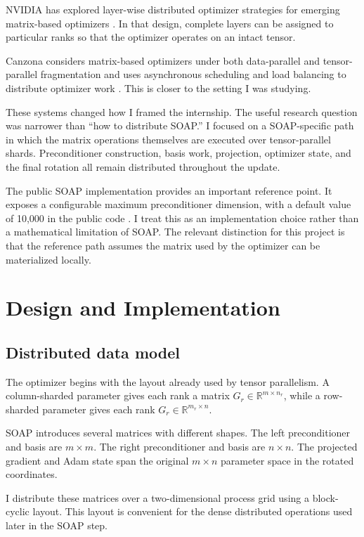 \documentclass[11pt]{article}
\begin{document}
NVIDIA has explored layer-wise distributed optimizer strategies for emerging matrix-based optimizers \citep{nvidia2026layerwise,nvidia2026emerging}. In that design, complete layers can be assigned to particular ranks so that the optimizer operates on an intact tensor.

Canzona considers matrix-based optimizers under both data-parallel and tensor-parallel fragmentation and uses asynchronous scheduling and load balancing to distribute optimizer work \citep{wang2026canzona}. This is closer to the setting I was studying.

These systems changed how I framed the internship. The useful research question was narrower than ``how to distribute SOAP.'' I focused on a SOAP-specific path in which the matrix operations themselves are executed over tensor-parallel shards. Preconditioner construction, basis work, projection, optimizer state, and the final rotation all remain distributed throughout the update.

The public SOAP implementation provides an important reference point. It exposes a configurable maximum preconditioner dimension, with a default value of 10,000 in the public code \citep{soapgithub}. I treat this as an implementation choice rather than a mathematical limitation of SOAP. The relevant distinction for this project is that the reference path assumes the matrix used by the optimizer can be materialized locally.

\section{Design and Implementation}

\subsection{Distributed data model}

The optimizer begins with the layout already used by tensor parallelism. A column-sharded parameter gives each rank a matrix
$G_r \in \mathbb{R}^{m \times n_r}$, while a row-sharded parameter gives each rank
$G_r \in \mathbb{R}^{m_r \times n}$.

SOAP introduces several matrices with different shapes. The left preconditioner and basis are $m \times m$. The right preconditioner and basis are $n \times n$. The projected gradient and Adam state span the original $m \times n$ parameter space in the rotated coordinates.

I distribute these matrices over a two-dimensional process grid using a block-cyclic layout. This layout is convenient for the dense distributed operations used later in the SOAP step.
\end{document}
